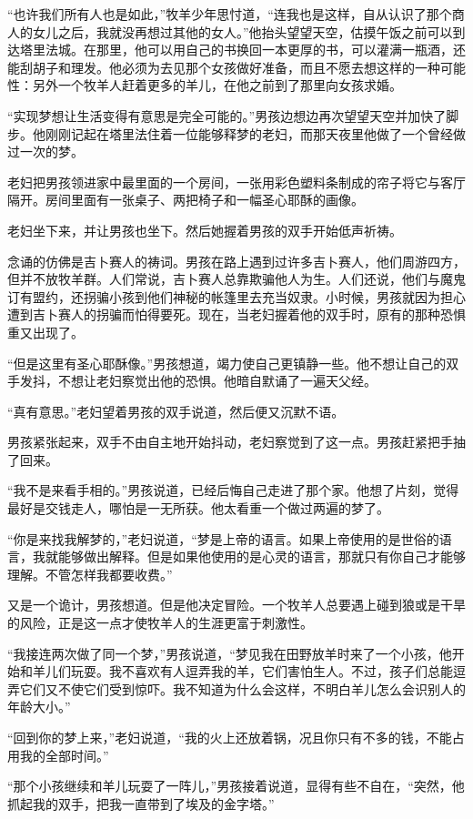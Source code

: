 \documentclass[twoside,openany]{book}
\begin{document}
“也许我们所有人也是如此，”牧羊少年思忖道，“连我也是这样，自从认识了那个商人的女儿之后，我就没再想过其他的女人。”他抬头望望天空，估摸午饭之前可以到达塔里法城。在那里，他可以用自己的书换回一本更厚的书，可以灌满一瓶酒，还能刮胡子和理发。他必须为去见那个女孩做好准备，而且不愿去想这样的一种可能性：另外一个牧羊人赶着更多的羊儿，在他之前到了那里向女孩求婚。

“实现梦想让生活变得有意思是完全可能的。”男孩边想边再次望望天空并加快了脚步。他刚刚记起在塔里法住着一位能够释梦的老妇，而那天夜里他做了一个曾经做过一次的梦。

老妇把男孩领进家中最里面的一个房间，一张用彩色塑料条制成的帘子将它与客厅隔开。房间里面有一张桌子、两把椅子和一幅圣心耶酥的画像。

老妇坐下来，并让男孩也坐下。然后她握着男孩的双手开始低声祈祷。

念诵的仿佛是吉卜赛人的祷词。男孩在路上遇到过许多吉卜赛人，他们周游四方，但并不放牧羊群。人们常说，吉卜赛人总靠欺骗他人为生。人们还说，他们与魔鬼订有盟约，还拐骗小孩到他们神秘的帐篷里去充当奴隶。小时候，男孩就因为担心遭到吉卜赛人的拐骗而怕得要死。现在，当老妇握着他的双手时，原有的那种恐惧重又出现了。

“但是这里有圣心耶酥像。”男孩想道，竭力使自己更镇静一些。他不想让自己的双手发抖，不想让老妇察觉出他的恐惧。他暗自默诵了一遍天父经。

“真有意思。”老妇望着男孩的双手说道，然后便又沉默不语。

男孩紧张起来，双手不由自主地开始抖动，老妇察觉到了这一点。男孩赶紧把手抽了回来。

“我不是来看手相的。”男孩说道，已经后悔自己走进了那个家。他想了片刻，觉得最好是交钱走人，哪怕是一无所获。他太看重一个做过两遍的梦了。

“你是来找我解梦的，”老妇说道，“梦是上帝的语言。如果上帝使用的是世俗的语言，我就能够做出解释。但是如果他使用的是心灵的语言，那就只有你自己才能够理解。不管怎样我都要收费。”

又是一个诡计，男孩想道。但是他决定冒险。一个牧羊人总要遇上碰到狼或是干旱的风险，正是这一点才使牧羊人的生涯更富于刺激性。

“我接连两次做了同一个梦，”男孩说道，“梦见我在田野放羊时来了一个小孩，他开始和羊儿们玩耍。我不喜欢有人逗弄我的羊，它们害怕生人。不过，孩子们总能逗弄它们又不使它们受到惊吓。我不知道为什么会这样，不明白羊儿怎么会识别人的年龄大小。”

“回到你的梦上来，”老妇说道，“我的火上还放着锅，况且你只有不多的钱，不能占用我的全部时间。”

“那个小孩继续和羊儿玩耍了一阵儿，”男孩接着说道，显得有些不自在，“突然，他抓起我的双手，把我一直带到了埃及的金字塔。”
\end{document}
